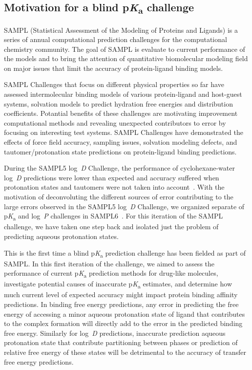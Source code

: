 \documentclass[9pt,lineno,final]{elife}
\newcommand{\pKa}{p\textit{K}\textsubscript{a}}
\newcommand{\logD}{log~\textit{D}}
\newcommand{\logP}{log~\textit{P}}
\begin{document}
\subsection{Motivation for a blind \pKa{} challenge}

SAMPL (Statistical Assessment of the Modeling of Proteins and Ligands) is a series of annual computational prediction challenges for the computational chemistry community. The goal of SAMPL is evaluate to current performance of the models and to bring the attention of quantitative biomolecular modeling field on major issues that limit the accuracy of protein-ligand binding models.

SAMPL Challenges that focus on different physical properties so far have assessed intermolecular binding models of various protein-ligand and host-guest systems, solvation models to predict hydration free energies and distribution coefficients. 
Potantial benefits of these challenges are motivating improvement computational methods and revealing unexpected contributors to error by focusing on interesting test systems. 
SAMPL Challenges have demonstrated the effects of force field accuracy, sampling issues, solvation modeling defects, and tautomer/protonation state predictions on protein-ligand binding predictions.  

During the SAMPL5 \logD{} Challenge, the performance of cyclohexane-water \logD{} predictions were lower than expected and accuracy suffered when protonation states and tautomers were not taken into account~\citep{Pickard:2016:J.Comput.AidedMol.Des., Bannan:2018:J.Comput.AidedMol.Des.}. 
With the motivation of deconvoluting the different sources of error contributing to the large errors observed in the SAMPL5 \logD{} Challenge, we organized separate of \pKa{} and \logP{} challenges in SAMPL6~\citep{Isik:2018:J.Comput.AidedMol.Des., Isik:2020:J.Comput.AidedMol.Des., Isik:2020:J.Comput.AidedMol.Des.a}. For this iteration of the SAMPL challenge, we have taken one step back and isolated just the problem of predicting aqueous protonation states. 

This is the first time a blind \pKa{} prediction challenge has been fielded as part of SAMPL. 
In this first iteration of the challenge, we aimed to assess the performance of current \pKa{} prediction methods for drug-like molecules, investigate potential causes of inaccurate \pKa{} estimates, and determine how much current level of expected accuracy might impact protein binding affinity predictions. 
In binding free energy predictions, any error in predicting the free energy of accessing a minor aqueous protonation state of ligand that contributes to the complex formation will directly add to the error in the predicted binding free energy. 
Similarly for \logD{} predictions, inaccurate prediction aqueous protonation state that contribute partitioning between phases or prediction of relative free energy of these states will be detrimental to the accuracy of transfer free energy predictions.
\end{document}
